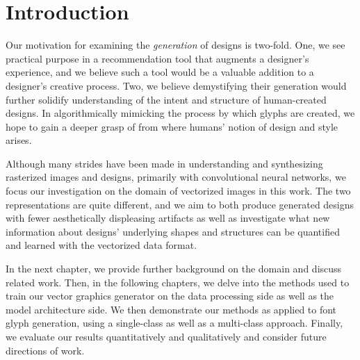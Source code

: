 \chapter{Introduction}


Our motivation for examining the \textit{generation} of designs is two-fold.
One, we see practical purpose in a recommendation tool that augments a designer's experience, and we believe such a tool would be a valuable addition to a designer's creative process.
Two, we believe demystifying their generation would further solidify understanding of the intent and structure of human-created designs.
In algorithmically mimicking the process by which glyphs are created, we hope to gain a deeper grasp of from where humans' notion of design and style arises.

Although many strides have been made in understanding and synthesizing rasterized images and designs, primarily with convolutional neural networks, we focus our investigation on the domain of vectorized images in this work.
The two representations are quite different, and we aim to both produce generated designs with fewer aesthetically displeasing artifacts as well as investigate what new information about designs' underlying shapes and structures can be quantified and learned with the vectorized data format.

In the next chapter, we provide further background on the domain and discuss related work.
Then, in the following chapters, we delve into the methods used to train our vector graphics generator on the data processing side as well as the model architecture side.
We then demonstrate our methods as applied to font glyph generation, using a single-class as well as a multi-class approach.
Finally, we evaluate our results quantitatively and qualitatively and consider future directions of work.
